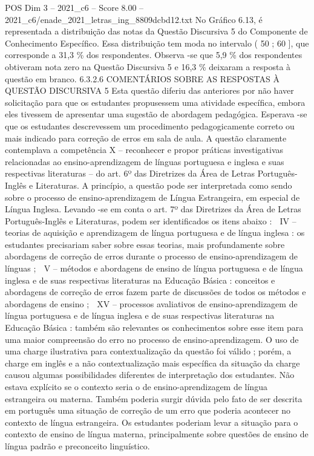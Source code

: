 \begin{textsample}{POS Dim 3 – 2021\_c6 – Score 8.00 – 2021\_c6/enade\_2021\_letras\_ing\_8809dcbd12.txt}
No Gráfico 6.13, é representada a distribuição das notas da Questão Discursiva 5 do Componente de Conhecimento Específico.
Essa distribuição tem moda no intervalo ( 50 ; 60 ], que corresponde a 31,3 \% dos respondentes.
Observa -se que 5,9 \% dos respondentes obtiveram nota zero na Questão Discursiva 5 e 16,3 \% deixaram a resposta à questão em branco. 6.3.2.6 COMENTÁRIOS SOBRE AS RESPOSTAS À QUESTÃO DISCURSIVA 5 Esta questão diferiu das anteriores por não haver solicitação para que os estudantes propusessem uma atividade específica, embora eles tivessem de apresentar uma sugestão de abordagem pedagógica.
Esperava -se que os estudantes descrevessem um procedimento pedagogicamente correto ou mais indicado para correção de erros em sala de aula.
A questão claramente contemplava a competência X – reconhecer e propor práticas investigativas relacionadas ao ensino-aprendizagem de línguas portuguesa e inglesa e suas respectivas literaturas – do art. 6º das Diretrizes da Área de Letras Português-Inglês e Literaturas.
A princípio, a questão pode ser interpretada como sendo sobre o processo de ensino-aprendizagem de Língua Estrangeira, em especial de Língua Inglesa.
Levando -se em conta o art. 7º das Diretrizes da Área de Letras Português-Inglês e Literaturas, podem ser identificados os itens abaixo :  IV – teorias de aquisição e aprendizagem de língua portuguesa e de língua inglesa : os estudantes precisariam saber sobre essas teorias, mais profundamente sobre abordagens de correção de erros durante o processo de ensino-aprendizagem de línguas ;  V – métodos e abordagens de ensino de língua portuguesa e de língua inglesa e de suas respectivas literaturas na Educação Básica : conceitos e abordagens de correção de erros fazem parte de discussões de todos os métodos e abordagens de ensino ;  XV – processos avaliativos de ensino-aprendizagem de língua portuguesa e de língua inglesa e de suas respectivas literaturas na Educação Básica : também são relevantes os conhecimentos sobre esse item para uma maior compreensão do erro no processo de ensino-aprendizagem.
O uso de uma charge ilustrativa para contextualização da questão foi válido ; porém, a charge em inglês e a não contextualização mais específica da situação da charge causou algumas possibilidades diferentes de interpretação dos estudantes.
Não estava explícito se o contexto seria o de ensino-aprendizagem de língua estrangeira ou materna.
Também poderia surgir dúvida pelo fato de ser descrita em português uma situação de correção de um erro que poderia acontecer no contexto de língua estrangeira.
Os estudantes poderiam levar a situação para o contexto de ensino de língua materna, principalmente sobre questões de ensino de língua padrão e preconceito linguístico.

\end{textsample}
